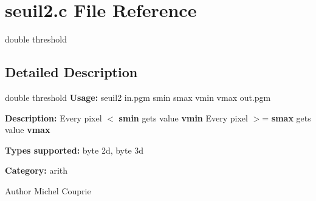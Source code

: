 \section{seuil2.c File Reference}
\label{seuil2_8c}


double threshold  




\subsection{Detailed Description}
double threshold {\bfseries Usage:} seuil2 in.pgm smin smax vmin vmax out.pgm

{\bfseries Description:} Every pixel $<$ {\bfseries smin} gets value {\bfseries vmin} Every pixel $>$= {\bfseries smax} gets value {\bfseries vmax} 

{\bfseries Types supported:} byte 2d, byte 3d

{\bfseries Category:} arith

\begin{DoxyAuthor}{Author}
Michel Couprie 
\end{DoxyAuthor}
